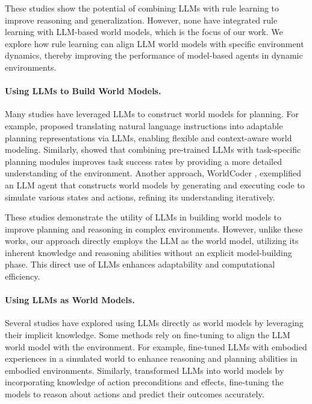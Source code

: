 \documentclass{article} %
\begin{document}
These studies show the potential of combining LLMs with rule learning to improve reasoning and generalization. However, none have integrated rule learning with LLM-based world models, which is the focus of our work. We explore how rule learning can align LLM world models with specific environment dynamics, thereby improving the performance of model-based agents in dynamic environments.

\paragraph{Using LLMs to Build World Models.}
Many studies have leveraged LLMs to construct world models for planning. For example, \cite{wong2023learning} proposed translating natural language instructions into adaptable planning representations via LLMs, enabling flexible and context-aware world modeling. Similarly, \cite{guan2023leveraging} showed that combining pre-trained LLMs with task-specific planning modules improves task success rates by providing a more detailed understanding of the environment. Another approach, WorldCoder \cite{tang2024worldcoder}, exemplified an LLM agent that constructs world models by generating and executing code to simulate various states and actions, refining its understanding iteratively.

These studies demonstrate the utility of LLMs in building world models to improve planning and reasoning in complex environments. However, unlike these works, our approach directly employs the LLM as the world model, utilizing its inherent knowledge and reasoning abilities without an explicit model-building phase. This direct use of LLMs enhances adaptability and computational efficiency.

\paragraph{Using LLMs as World Models.}
Several studies have explored using LLMs directly as world models by leveraging their implicit knowledge. Some methods rely on fine-tuning to align the LLM world model with the environment. For example, \cite{xiang2024language} fine-tuned LLMs with embodied experiences in a simulated world to enhance reasoning and planning abilities in embodied environments. Similarly, \cite{xie2024making} transformed LLMs into world models by incorporating knowledge of action preconditions and effects, fine-tuning the models to reason about actions and predict their outcomes accurately.
\end{document}
